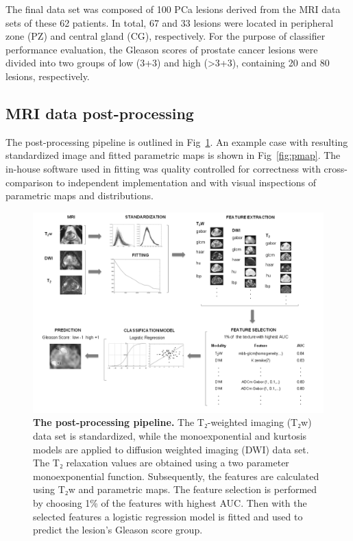 The final data set was composed of 100 PCa lesions derived from the MRI data
sets of these 62 patients. In total, 67 and 33 lesions were located in
peripheral zone (PZ) and central gland (CG), respectively. For the purpose of
classifier performance evaluation, the Gleason scores of prostate cancer lesions
were divided into two groups of low (3+3) and high (>3+3), containing 20 and 80
lesions, respectively.


\subsection{MRI data post-processing}

The post-processing pipeline is outlined in Fig~\ref{fig:pipeline}. An
example case with resulting standardized image and fitted parametric maps is
shown in Fig~\ref{fig:pmap}. The in-house software used in fitting was
quality controlled for correctness with cross-comparison to independent
implementation and with visual inspections of parametric maps and distributions.

\begin{figure}[!h]
    \centering
    \includegraphics[width=1.0\textwidth]{figures/fig1}
    \caption{{\bf The post-processing pipeline.}
    The T₂-weighted imaging (T₂w) data set is standardized, while the
    monoexponential and kurtosis models are applied to diffusion weighted
    imaging (DWI) data set. The T₂ relaxation values are obtained using a two
    parameter monoexponential function. Subsequently, the features are
    calculated using T₂w and parametric maps. The feature selection is performed
    by choosing 1\% of the features with highest AUC\@. Then with the selected
    features a logistic regression model is fitted and used to predict the
    lesion's Gleason score group.}%
    \label{fig:pipeline}
\end{figure}


